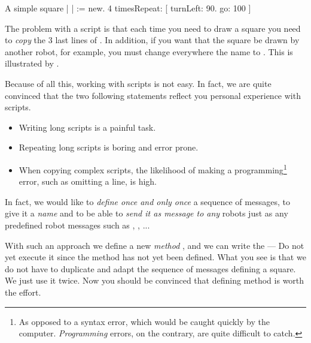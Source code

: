 \begin{scriptwithtitle}{A simple square}\label{src:againSquare}
| \caro |
\caro := \Turtle new.
4 timesRepeat: 
   [ \caro turnLeft: 90.
   \caro go: 100 ]
\end{scriptwithtitle}

The problem with a script is that each time you need to draw a square
you need to \emph{copy} the 3 last lines of .  In addition, if you want that the square be drawn by another robot, \daly for example, you must change everywhere the name \caro to \daly. This is illustrated by .


Because of all this, working with scripts is not easy. In
fact, we are quite convinced that the two following statements
reflect you personal experience with scripts.

\begin{itemize}
\item Writing long scripts is a painful task.

\item Repeating long scripts is boring and error prone. 

\item When copying complex scripts, the likelihood of making a
programming\footnote{As opposed to a syntax error, which would be
caught quickly by the computer. \emph{Programming} errors, on the
contrary, are quite difficult to catch.}  error, such as omitting a
line, is high.
\end{itemize}


In fact, we would like to \emph{define once and only once} a sequence of messages, to give it a \emph{name} and to be able to \emph{send it as message to any} robots just as any predefined robot messages such as \go, \north, \jump... 
         
With such an approach we define a new \emph{method} , and 
we can write the  --- Do not yet execute it 
since the method  has not yet been defined. What you see is that we 
do not have to duplicate and adapt the sequence of messages defining a square. We just use it twice. Now you should be convinced that defining method is worth the effort. 
   
